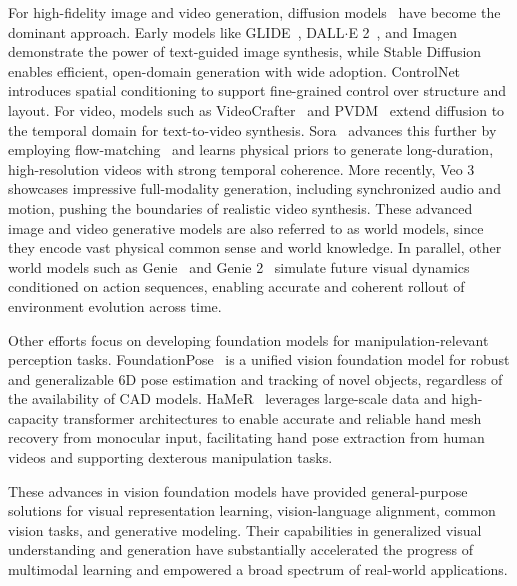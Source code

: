 \documentclass[10pt, a4paper, logo, copyright]{googledeepmind} %
\begin{document}
For high-fidelity image and video generation, diffusion models~\cite{ho2020denoising, song2020denoising, song2020score} have become the dominant approach. Early models like GLIDE~\cite{nichol2022glide}, DALL$\cdot$E 2~\cite{ramesh2022hierarchical}, and Imagen~\cite{saharia2022photorealistic} demonstrate the power of text-guided image synthesis, while Stable Diffusion~\cite{rombach2022high, esser2024scaling} enables efficient, open-domain generation with wide adoption. ControlNet~\cite{zhang2023adding} introduces spatial conditioning to support fine-grained control over structure and layout. For video, models such as VideoCrafter~\cite{chen2023videocrafter1, chen2024videocrafter2} and PVDM~\cite{yu2023video} extend diffusion to the temporal domain for text-to-video synthesis. Sora~\cite{videoworldsimulators2024} advances this further by employing flow-matching~\cite{lipmanflow,lipman2024flow} and learns physical priors to generate long-duration, high-resolution videos with strong temporal coherence. More recently, Veo 3 showcases impressive full-modality generation, including synchronized audio and motion, pushing the boundaries of realistic video synthesis. These advanced image and video generative models are also referred to as world models, since they encode vast physical common sense and world knowledge. In parallel, other world models such as Genie~\cite{bruce2024genie} and Genie 2~\cite{parkerholder2024genie2} simulate future visual dynamics conditioned on action sequences, enabling accurate and coherent rollout of environment evolution across time.

Other efforts focus on developing foundation models for manipulation-relevant perception tasks. FoundationPose~\cite{wen2024foundationpose} is a unified vision foundation model for robust and generalizable 6D pose estimation and tracking of novel objects, regardless of the availability of CAD models. HaMeR~\cite{pavlakos2024reconstructing} leverages large-scale data and high-capacity transformer architectures to enable accurate and reliable hand mesh recovery from monocular input, facilitating hand pose extraction from human videos and supporting dexterous manipulation tasks. 

These advances in vision foundation models have provided general-purpose solutions for visual representation learning, vision-language alignment, common vision tasks, and generative modeling. Their capabilities in generalized visual understanding and generation have substantially accelerated the progress of multimodal learning and empowered a broad spectrum of real-world applications.
\end{document}
